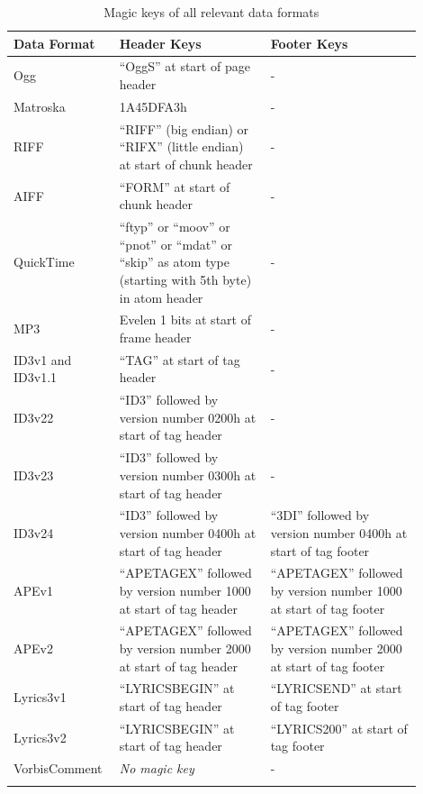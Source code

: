 \begin{longtable}{|p{0.2\linewidth}|p{0.35\linewidth}|p{0.35\linewidth}|}
\hline
\rowcolor[gray]{.9}\textbf{Data Format} & \textbf{Header Keys} & \textbf{Footer Keys} \\
\endhead
\hline
Ogg  & ``OggS'' at start of page header & -  \\
\hline
Matroska  & 1A45DFA3h & -  \\
\hline
RIFF  & ``RIFF'' (big endian) or ``RIFX'' (little endian) at start of chunk header & -  \\
\hline
AIFF  & ``FORM'' at start of chunk header & -  \\
\hline
QuickTime  & ``ftyp'' or ``moov'' or ``pnot'' or ``mdat'' or ``skip'' as atom type (starting with 5th byte) in atom header & -  \\
\hline
MP3  & Evelen 1 bits at start of frame header & -  \\
\hline
ID3v1 and ID3v1.1  & ``TAG'' at start of tag header & -  \\
\hline
ID3v22  & ``ID3'' followed by version number 0200h at start of tag header & -  \\
\hline
ID3v23  & ``ID3'' followed by version number 0300h at start of tag header & -  \\
\hline
ID3v24  & ``ID3'' followed by version number 0400h at start of tag header & ``3DI'' followed by version number 0400h at start of tag footer \\
\hline
APEv1  & ``APETAGEX'' followed by version number 1000 at start of tag header & ``APETAGEX'' followed by version number 1000 at start of tag footer \\
\hline
APEv2  & ``APETAGEX'' followed by version number 2000 at start of tag header & ``APETAGEX'' followed by version number 2000 at start of tag footer \\
\hline
Lyrics3v1  & ``LYRICSBEGIN'' at start of tag header & ``LYRICSEND'' at start of tag footer  \\
\hline
Lyrics3v2  & ``LYRICSBEGIN'' at start of tag header & ``LYRICS200'' at start of tag footer  \\
\hline
VorbisComment  & \emph{No magic key} & -  \\
\hline
\caption{Magic keys of all relevant data formats}
\label{tab:magicKeys}
\end{longtable}

